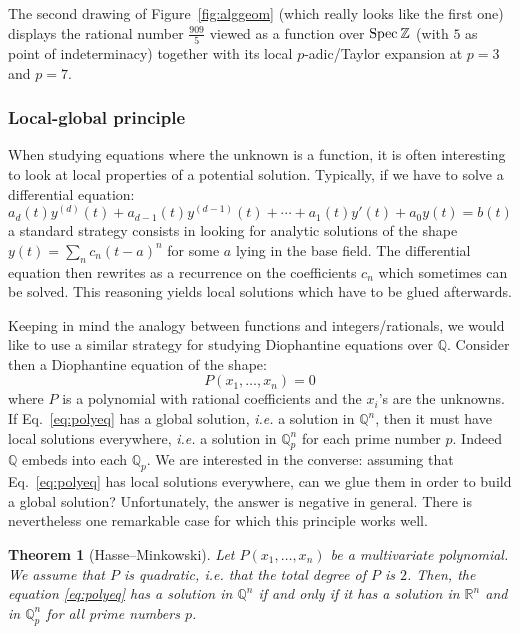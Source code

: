 \documentclass[11pt]{article}
\numberwithin{equation}{section}
\numberwithin{figure}{section}
\newtheorem{theo}{Theorem}[section]
\theoremstyle{definition}
\newcommand{\Z}{\mathbb Z}
\newcommand{\Q}{\mathbb Q}
\newcommand{\Qp}{\Q_p}
\newcommand{\R}{\mathbb R}
\newcommand{\spec}{\text{\rm Spec}\:}
\begin{document}
The second drawing of Figure~\ref{fig:alggeom} (which really looks like 
the first one) displays the rational number $\frac{909} 5$ viewed as a 
function over $\spec \Z$ (with $5$ as point of indeterminacy) together 
with its local $p$-adic/Taylor expansion at $p = 3$ and $p = 7$.

\subsubsection{Local-global principle}
\label{sssec:localglobal}

When studying equations where the unknown is a function, it is often 
interesting to look at local properties of a potential solution.
Typically, if we have to solve a differential equation:
$$a_d(t) y^{(d)}(t) + a_{d-1}(t) y^{(d-1)}(t) + \cdots + a_1(t) y'(t)
+ a_0 y(t) = b(t)$$
a standard strategy consists in looking for analytic solutions of the 
shape $y(t) = \sum_n c_n (t{-}a)^n$ for some $a$ lying in the base 
field. The differential equation then rewrites as a recurrence on the 
coefficients $c_n$ which sometimes can be solved. This reasoning yields
local solutions which have to be glued afterwards.

Keeping in mind the analogy between functions and integers/rationals, we 
would like to use a similar strategy for studying Diophantine equations
over $\Q$. Consider then a Diophantine equation of the shape:
\begin{equation}
\label{eq:polyeq}
P(x_1, \ldots, x_n) = 0
\end{equation}
where $P$ is a polynomial with rational coefficients and the $x_i$'s are
the unknowns. If Eq.~\eqref{eq:polyeq} has a global solution, \emph{i.e.}
a solution in $\Q^n$, then it must have local solutions everywhere,
\emph{i.e.} a solution in $\Qp^n$ for each prime number $p$. Indeed $\Q$
embeds into each $\Qp$. We are interested in the converse: assuming that
Eq.~\eqref{eq:polyeq} has local solutions everywhere, can we glue them 
in order to build a global solution? 
Unfortunately, the answer is negative in general. There is nevertheless
one remarkable case for which this principle works well.

\begin{theo}[Hasse--Minkowski]
Let $P(x_1, \ldots, x_n)$ be a multivariate polynomial. We assume that
$P$ is quadratic, \emph{i.e.} that the total degree of $P$ is $2$.
Then,
the equation \eqref{eq:polyeq} has a solution in $\Q^n$ if and only if
it has a solution in $\R^n$ and in $\Qp^n$ for all prime numbers $p$.
\end{theo}
\end{document}
